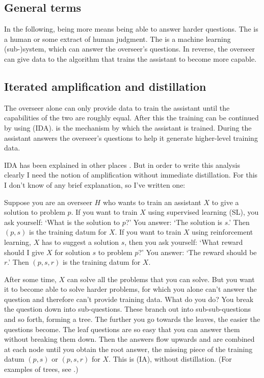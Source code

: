 \documentclass{farlamp}
\begin{document}
\subsection{General terms}

In the following, being more  means being able to answer harder
questions. The  is a human or some extract of human judgment. The
 is a machine learning (sub-)system, which can answer the
overseer's questions. In reverse, the overseer can give data to the algorithm
that trains the assistant to become more capable.


\subsection{Iterated amplification and distillation}
\label{sec:iad}

The overseer alone can only provide data to train the assistant until the
capabilities of the two are roughly equal. After this the training can be
continued by using  (IDA).
 is the mechanism by which the assistant is trained. During
 the assistant answers the overseer's questions to help it
generate higher-level training data.

IDA has been explained in other places \parencite{CotrIDA, ESSMLPIDA}. But in
order to write this analysis clearly I need the notion of amplification without
immediate distillation. For this I don't know of any brief explanation, so I've
written one:

Suppose you are an overseer $H$ who wants to train an assistant $X$
\parencite[symbols taken from][]{CSASupAmp} to give a solution to problem $p$.
If you want to train $X$ using supervised learning (SL), you ask yourself: ‘What
is the solution to $p$?’ You answer: ‘The solution is $s$.’ Then $(p, s)$ is the
training datum for $X$. If you want to train $X$ using reinforcement learning,
$X$ has to suggest a solution $s$, then you ask yourself: ‘What reward should I
give $X$ for solution $s$ to problem $p$?’ You answer: ‘The reward should be
$r$.’ Then $(p, s, r)$ is the training datum for $X$.

After some time, $X$ can solve all the problems that you can solve. But you want
it to become able to solve harder problems, for which you alone can't answer the
question and therefore can't provide training data. What do you do? You break
the question down into sub-questions. These branch out into sub-sub-questions
and so forth, forming a tree. The further you go towards the leaves, the easier
the questions become. The leaf questions are so easy that you can answer them
without breaking them down. Then the answers flow upwards and are combined at
each node until you obtain the root answer, the missing piece of the training
datum $(p, s)$ or $(p, s, r)$ for $X$. This is 
(IA), without distillation. (For examples of trees, see \textcite{StuhFacCog}.)
\end{document}
